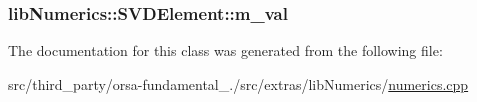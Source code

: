\subsubsection[{m\+\_\+val}]{ lib\+Numerics\+::\+S\+V\+D\+Element\+::m\+\_\+val}\label{classlibNumerics_1_1SVDElement_a0d3ae2a9e21d9c77748632a9a1172603}


The documentation for this class was generated from the following file\+:\begin{DoxyCompactItemize}
\item 
src/third\+\_\+party/orsa-\/fundamental\+\_./src/extras/lib\+Numerics/\hyperlink{extras_2libNumerics_2numerics_8cpp}{numerics.\+cpp}\end{DoxyCompactItemize}
